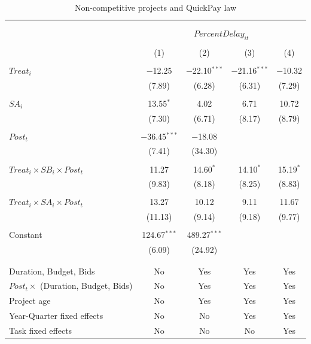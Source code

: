 \documentclass[
]{article}
\begin{document}
\begin{table}[H] \centering 
  \caption{Non-competitive projects and QuickPay law} 
  \label{} 
\small 
\begin{tabular}{@{\extracolsep{-2pt}}lcccc} 
\\[-1.8ex]\hline 
\hline \\[-1.8ex] 
\\[-1.8ex] & \multicolumn{4}{c}{$PercentDelay_{it}$  } \\ 
\\[-1.8ex] & (1) & (2) & (3) & (4)\\ 
\hline \\[-1.8ex] 
 $Treat_i$ & $-$12.25 & $-$22.10$^{***}$ & $-$21.16$^{***}$ & $-$10.32 \\ 
  & (7.89) & (6.28) & (6.31) & (7.29) \\ 
  & & & & \\ 
 $SA_i$ & 13.55$^{*}$ & 4.02 & 6.71 & 10.72 \\ 
  & (7.30) & (6.71) & (8.17) & (8.79) \\ 
  & & & & \\ 
 $Post_t$ & $-$36.45$^{***}$ & $-$18.08 &  &  \\ 
  & (7.41) & (34.30) &  &  \\ 
  & & & & \\ 
 $Treat_i \times SB_i \times Post_t$ & 11.27 & 14.60$^{*}$ & 14.10$^{*}$ & 15.19$^{*}$ \\ 
  & (9.83) & (8.18) & (8.25) & (8.83) \\ 
  & & & & \\ 
 $Treat_i \times SA_i \times Post_t$ & 13.27 & 10.12 & 9.11 & 11.67 \\ 
  & (11.13) & (9.14) & (9.18) & (9.77) \\ 
  & & & & \\ 
 Constant & 124.67$^{***}$ & 489.27$^{***}$ &  &  \\ 
  & (6.09) & (24.92) &  &  \\ 
  & & & & \\ 
\hline \\[-1.8ex] 
Duration, Budget, Bids & No & Yes & Yes & Yes \\ 
$Post_t \times $  (Duration, Budget, Bids) & No & Yes & Yes & Yes \\ 
Project age & No & Yes & Yes & Yes \\ 
Year-Quarter fixed effects & No & No & Yes & Yes \\ 
Task fixed effects & No & No & No & Yes \\ 

\end{tabular}
\end{table}
\end{document}
